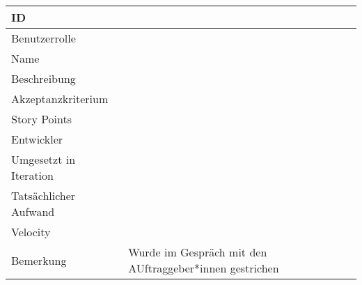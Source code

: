 \begin{tabularx}{\textwidth}{|p{}|X|}
	\hline
	ID & \\
	\hline
	Benutzerrolle & \\
	\hline
	Name & \\
	\hline
	Beschreibung & \\
	\hline
	Akzeptanzkriterium & \\
	\hline
	Story Points & \\
	\hline
	Entwickler & \\
	\hline
	Umgesetzt in Iteration & \\ 
	\hline
	Tatsächlicher Aufwand & \\
	\hline
	Velocity & \\
	\hline
	Bemerkung & Wurde im Gespräch mit den AUftraggeber*innen gestrichen\\
	\hline
\end{tabularx}
\vspace{20pt}
